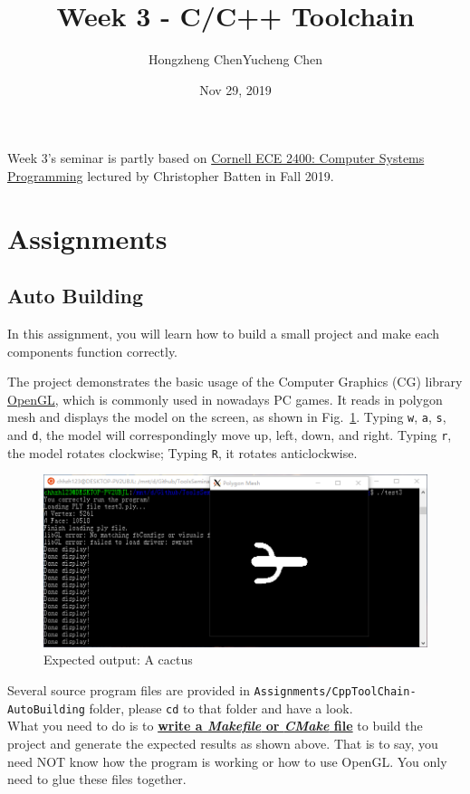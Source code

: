 \documentclass[english]{../TexTemplate/thesis}
\title{Week 3 - C/C++ Toolchain}
\author{Hongzheng Chen\qquad Yucheng Chen}
\date{Nov 29, 2019}
\begin{document}
\maketitle

Week 3's seminar is partly based on \href{https://cornell-ece2400.github.io/ece2400-docs/ece2400-sec2-c-basics/}{Cornell ECE 2400: Computer Systems Programming} lectured by Christopher Batten in Fall 2019.

\section{Assignments}
\subsection{Auto Building}
In this assignment, you will learn how to build a small project and make each components function correctly.

The project demonstrates the basic usage of the Computer Graphics (CG) library \href{https://www.opengl.org}{OpenGL}, which is commonly used in nowadays PC games.
It reads in polygon mesh and displays the model on the screen, as shown in Fig.~\ref{fig:cactus}.
Typing \verb'w', \verb'a', \verb's', and \verb'd', the model will correspondingly move up, left, down, and right.
Typing \verb'r', the model rotates clockwise; Typing \verb'R', it rotates anticlockwise.
\begin{figure}[H]
\centering
\includegraphics[width=\linewidth]{fig/assignments/autobuild_result.png}
\caption{Expected output: A cactus}
\label{fig:cactus}
\end{figure}

Several source program files are provided in \verb'Assignments/CppToolChain-AutoBuilding' folder, please \verb'cd' to that folder and have a look.\\
What you need to do is to \underline{\textbf{write a \emph{Makefile} or \emph{CMake} file}} to build the project and generate the expected results as shown above.
That is to say, you need NOT know how the program is working or how to use OpenGL.
You only need to glue these files together.
\end{document}
